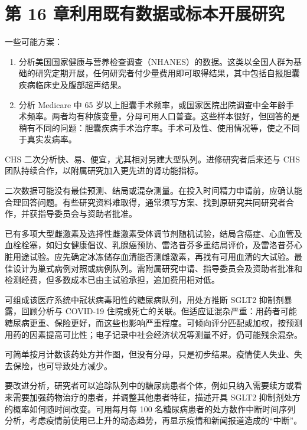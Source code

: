 \section{第 16 章\quad 利用既有数据或标本开展研究}
\begin{answerlist}
\item[1.] 一些可能方案：
\begin{enumerate}
\item 分析美国国家健康与营养检查调查（NHANES）的数据。这类以全国人群为基础的研究定期开展，任何研究者付少量费用即可取得结果，其中包括自报胆囊疾病临床史及腹部超声结果。
\item 分析 Medicare 中 65 岁以上胆囊手术频率，或国家医院出院调查中全年龄手术频率。两者均有种族变量，分母可用人口普查。这些样本很好，但回答的是稍有不同的问题：胆囊疾病手术治疗率。手术可及性、使用情况等，使之不同于真实发病率。
\end{enumerate}
\item[2a.] CHS 二次分析快、易、便宜，尤其相对另建大型队列。进修研究者后来还与 CHS 团队持续合作，以附属研究加入更先进的肾功能指标。
\item[2b.] 二次数据可能没有最佳预测、结局或混杂测量。在投入时间精力申请前，应确认能合理回答问题。有些研究资料难取得，通常须写方案、找到原研究共同研究者合作，并获指导委员会与资助者批准。
\item[3.] 已有多项大型雌激素及选择性雌激素受体调节剂随机试验，结局含癌症、心血管及血栓栓塞，如妇女健康倡议、乳腺癌预防、雷洛昔芬多重结局评价，及雷洛昔芬心脏用途试验。应先确定冰冻储存血清能否测雌激素，再找有可用血清的大试验。最佳设计为巢式病例对照或病例队列。需附属研究申请、指导委员会及资助者批准和检测经费，但多数成本已由主试验承担，追加费用相对低。
\item[4a.] 可组成该医疗系统中冠状病毒阳性的糖尿病队列，用处方推断 SGLT2 抑制剂暴露，回顾分析与 COVID-19 住院或死亡的关联。但适应证混杂严重：用药者可能糖尿病更重、保险更好，而这些也影响严重程度。可倾向评分匹配或加权，按预测用药的因素提高可比性；电子记录中社会经济状况等测量不好，仍可能残余混杂。
\item[4b.] 可简单按月计数该药处方并作图，但没有分母，只是初步结果。疫情使人失业、失去保险，也可导致处方减少。

要改进分析，研究者可以追踪队列中的糖尿病患者个体，例如只纳入需要续方或看来需要加强药物治疗的患者，并调整其他患者特征，描述开具 SGLT2 抑制剂处方的概率如何随时间改变。可用每月每 100 名糖尿病患者的处方数作中断时间序列分析，考虑疫情前使用已上升的动态趋势，再显示疫情和新闻报道造成的“中断”。
\end{answerlist}

